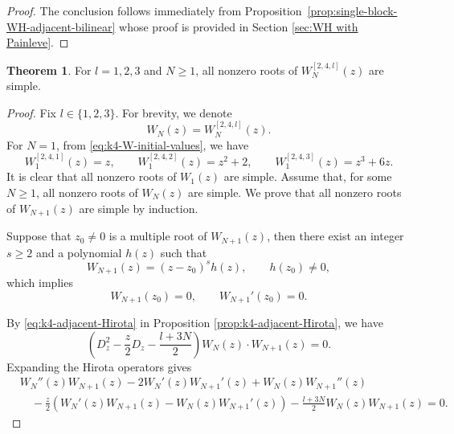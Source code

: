 \documentclass[preprint,3p,10pt]{elsarticle}
\theoremstyle{definition}
\newtheorem{theorem}{Theorem}[section]
\begin{document}
\begin{proof}
The conclusion follows immediately from Proposition~\ref{prop:single-block-WH-adjacent-bilinear} whose proof is provided in Section \ref{sec:WH with Painleve}.
\end{proof}




\begin{theorem}\label{thm:k4-m2-simple-nonzero}
For \(l=1,2,3\) and \(N\ge1\), all nonzero roots of \(W_N^{[2,4,l]}(z)\) are simple.
\end{theorem}

\begin{proof}
Fix \(l\in\{1,2,3\}\). For brevity, we denote
\begin{equation}
    W_N(z)=W_N^{[2,4,l]}(z).
\end{equation}
For \(N=1\), from \eqref{eq:k4-W-initial-values}, we have
\begin{equation}
    W_1^{[2,4,1]}(z)=z,\qquad
    W_1^{[2,4,2]}(z)=z^2+2,\qquad
    W_1^{[2,4,3]}(z)=z^3+6z.
\end{equation}
It is clear that all nonzero roots of \(W_1(z)\) are simple.
Assume that, for some \(N\ge1\), all nonzero roots of \(W_N(z)\) are simple. We prove that all nonzero roots of \(W_{N+1}(z)\) are simple by induction.

Suppose that \(z_0\neq0\) is a multiple root of \(W_{N+1}(z)\), then there exist an integer \(s\geq2\) and a polynomial \(h(z)\) such that
\begin{equation}
\label{eq:k4-WNplus1-local-factor}
    W_{N+1}(z)=(z-z_0)^s h(z),
    \qquad
    h(z_0)\neq0,
\end{equation}
which implies
\begin{equation}
\label{eq:k4-WNplus1-root-derivative}
    W_{N+1}(z_0)=0,
    \qquad
    W_{N+1}'(z_0)=0.
\end{equation}


By \eqref{eq:k4-adjacent-Hirota} in Proposition \ref{prop:k4-adjacent-Hirota}, we have
\begin{equation}
    \left(D_z^2-\frac{z}{2}D_z-\frac{l+3N}{2}\right)W_N(z)\cdot W_{N+1}(z)=0.
\end{equation}
Expanding the Hirota operators gives
\begin{equation}
\label{eq:k4-Hirota-expanded-direct}
\begin{aligned}
    &W_N''(z)W_{N+1}(z)-2W_N'(z)W_{N+1}'(z)+W_N(z)W_{N+1}''(z) \\
    &\quad
    -\frac{z}{2}\left(W_N'(z)W_{N+1}(z)-W_N(z)W_{N+1}'(z)\right)
    -\frac{l+3N}{2}W_N(z)W_{N+1}(z)=0.
\end{aligned}
\end{equation}



\end{proof}
\end{document}
